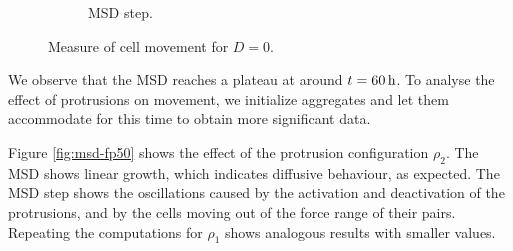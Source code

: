 \begin{figure}[h]
\begin{subfigure}{0.4\textwidth}
        \caption{MSD step.}
    \end{subfigure}
    \caption{Measure of cell movement for $D=0$.}
    \label{fig:msd-fp0}
\end{figure}

We observe that the MSD reaches a plateau at around $t=\text{\SI{60}{\hour}}$. To analyse the effect of protrusions on movement, we initialize aggregates and let them accommodate for this time to obtain more significant data.

Figure \ref{fig:msd-fp50} shows the effect of the protrusion configuration $\rho_2$. The MSD shows linear growth, which indicates diffusive behaviour, as expected. The MSD step shows the oscillations caused by the activation and deactivation of the protrusions, and by the cells moving out of the force range of their pairs. Repeating the computations for $\rho_1$ shows analogous results with smaller values.
